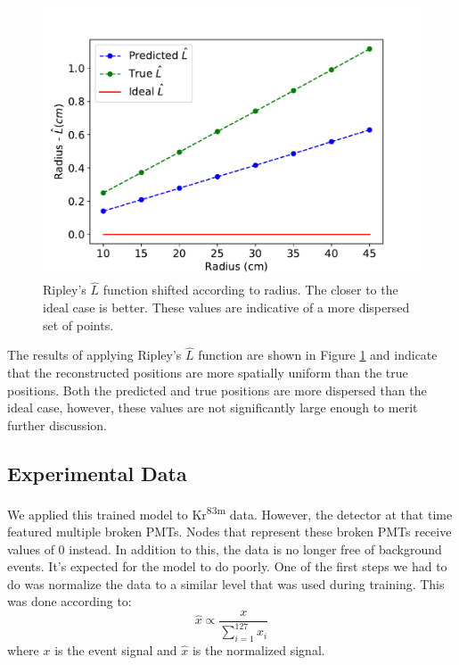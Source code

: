 \documentclass[../thesis.tex]{subfiles}
\begin{document}
\begin{figure}[t]
	\centering
	\includegraphics[width=0.8\linewidth]{figures/gcn28_ripley-L.pdf}
	\caption{
	Ripley's $\widehat{L}$ function shifted according to radius.
	The closer to the ideal case is better.
	These values are indicative of a more dispersed set of points.
	}
	\label{fig:Ripley}
\end{figure}

\par The results of applying Ripley's $\widehat{L}$ function are shown in Figure \ref{fig:Ripley} and indicate that the reconstructed positions are more spatially uniform than the true positions.
Both the predicted and true positions are more dispersed than the ideal case, however, these values are not significantly large enough to merit further discussion.

\subsection{Experimental Data}\label{subsec:Experiment}
We applied this trained model to Kr\textsuperscript{83m} data.
However, the detector at that time featured multiple broken PMTs.
Nodes that represent these broken PMTs receive values of 0 instead.
In addition to this, the data is no longer free of background events.
It's expected for the model to do poorly.
One of the first steps we had to do was normalize the data to a similar level that was used during training.
This was done according to:
\begin{equation}
	\hat{x} \propto \dfrac{x}{\sum_{i=1}^{127} x_i}
\end{equation}
where $x$ is the event signal and $\hat{x}$ is the normalized signal.
\end{document}
